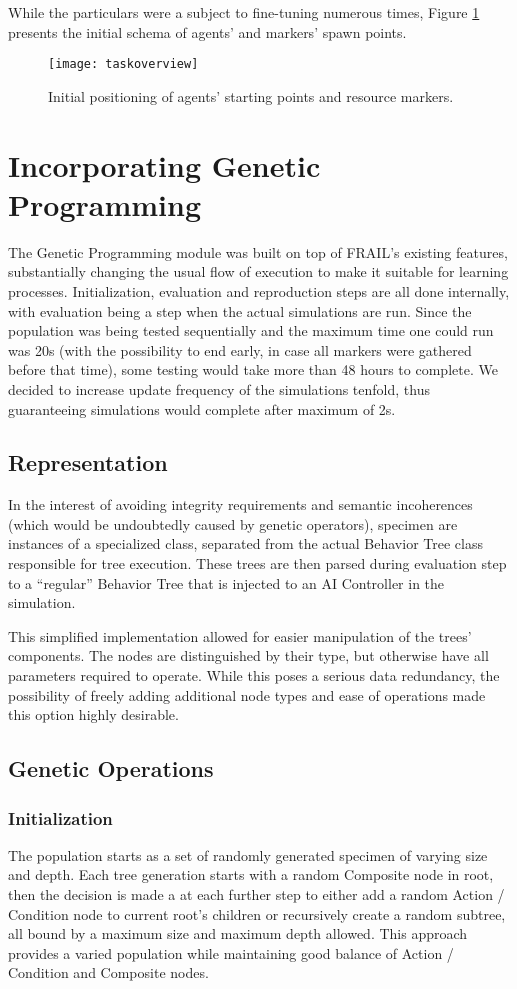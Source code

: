While the particulars were a subject to fine-tuning numerous times, Figure \ref{fig:x taskoverview} presents the initial schema of agents' and markers' spawn points.
\begin{figure}[h]
    \centering
    \texttt{[image: taskoverview]}
    \caption{Initial positioning of agents' starting points and resource markers.}
    \label{fig:x taskoverview}
\end{figure}
\section{Incorporating Genetic Programming}
The Genetic Programming module was built on top of FRAIL's existing features, substantially changing the usual flow of execution to make it suitable for learning processes. Initialization, evaluation and reproduction steps are all done internally, with evaluation being a step when the actual simulations are run. Since the population was being tested sequentially and the maximum time one could run was 20s (with the possibility to end early, in case all markers were gathered before that time), some testing would take more than 48 hours to complete. We decided to increase update frequency of the simulations tenfold, thus guaranteeing simulations would complete after maximum of 2s.
\subsection{Representation}
In the interest of avoiding integrity requirements and semantic incoherences (which would be undoubtedly caused by genetic operators), specimen are instances of a specialized class, separated from the actual Behavior Tree class responsible for tree execution. These trees are then parsed during evaluation step to a ``regular'' Behavior Tree that is injected to an AI Controller in the simulation.

This simplified implementation allowed for easier manipulation of the trees' components. The nodes are distinguished by their type, but otherwise have all parameters required to operate. While this poses a serious data redundancy, the possibility of freely adding additional node types and ease of operations made this option highly desirable.
\subsection{Genetic Operations}
\subsubsection{Initialization}
The population starts as a set of randomly generated specimen of varying size and depth. Each tree generation starts with a random Composite node in root, then the decision is made a at each further step to either add a random Action / Condition node to current root's children or recursively create a random subtree, all bound by a maximum size and maximum depth allowed. This approach provides a varied population while maintaining good balance of Action / Condition and Composite nodes.
